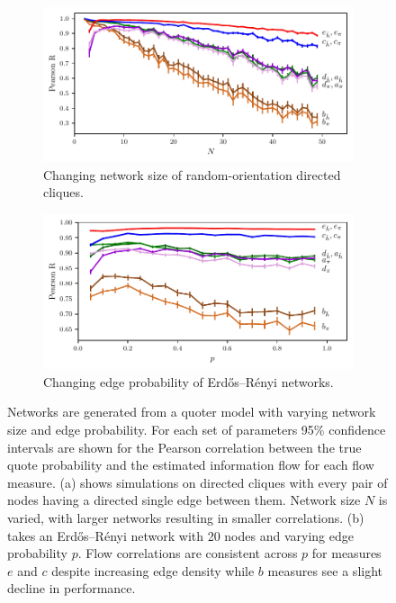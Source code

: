 \begin{figure}[!htbp]
	\centering
	\begin{subfigure}[t]{\textwidth}
		\centering
		\includegraphics{chapter3/figs/zipf_network_size.pdf}
		\caption{Changing network size of random-orientation directed cliques.}
		\label{fig:flow_networksize}
	\end{subfigure}

	\begin{subfigure}[t]{\textwidth}
		\centering
		\includegraphics{chapter3/figs/zipf_ER.pdf}
		\caption{Changing edge probability of Erdős–Rényi networks.}
		\label{fig:flow_ERchange}
	\end{subfigure}
	\caption{Networks are generated from a quoter model with varying network size and edge probability. For each set of parameters 95\% confidence intervals are shown for the Pearson correlation between the true quote probability and the estimated information flow for each flow measure. (a) shows simulations on directed cliques with every pair of nodes having a directed single edge between them. Network size $N$ is varied, with larger networks resulting in smaller correlations. (b) takes an Erdős–Rényi network with 20 nodes and varying edge probability $p$. Flow correlations are consistent across $p$ for measures $e$ and $c$ despite increasing edge density while $b$ measures see a slight decline in performance. \label{fig:flow_sizeandER}}
\end{figure}

